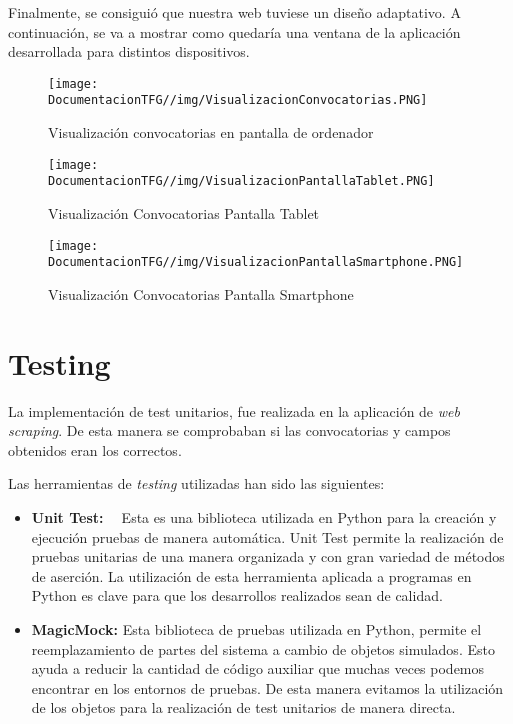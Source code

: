 Finalmente, se consiguió que nuestra web tuviese un diseño adaptativo. A continuación, se va a mostrar como quedaría una ventana de la aplicación desarrollada para distintos dispositivos.

\begin{figure}[H]
    \centering
    \texttt{[image: DocumentacionTFG//img/VisualizacionConvocatorias.PNG]}
    \caption{Visualización convocatorias en pantalla de ordenador}
\end{figure}

\begin{figure}[H]
    \centering
    \texttt{[image: DocumentacionTFG//img/VisualizacionPantallaTablet.PNG]}
    \caption{Visualización Convocatorias Pantalla Tablet}
\end{figure}

\begin{figure}[H]
    \centering
    \texttt{[image: DocumentacionTFG//img/VisualizacionPantallaSmartphone.PNG]}
    \caption{Visualización Convocatorias Pantalla Smartphone}
\end{figure}

\section{Testing}
La implementación de test unitarios, fue realizada en la aplicación de \textit{web scraping}. De esta manera se comprobaban si las convocatorias y campos obtenidos eran los correctos.

Las herramientas de \textit{testing} utilizadas han sido las siguientes:

\begin{itemize}
    \item \textbf{Unit Test: ~\cite{unittest:latex}} Esta es una biblioteca utilizada en Python para la creación y ejecución pruebas de manera automática. Unit Test permite la realización de pruebas unitarias de una manera organizada y con gran variedad de métodos de aserción. La utilización de esta herramienta aplicada a programas en Python es clave para que los desarrollos realizados sean de calidad.
    \item \textbf{MagicMock:} Esta biblioteca de pruebas utilizada en Python, permite el reemplazamiento de partes del sistema a cambio de objetos simulados. Esto ayuda a reducir la cantidad de código auxiliar que muchas veces podemos encontrar en los entornos de pruebas. De esta manera evitamos la utilización de los objetos para la realización de test unitarios de manera directa.
\end{itemize}


